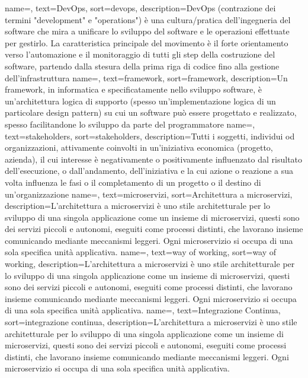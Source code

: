 {
	name=,
	text=DevOps,
	sort=devops,
	description={DevOps (contrazione dei termini "development" e "operations") è una cultura/pratica dell'ingegneria del software che mira a unificare lo sviluppo del software e le operazioni effettuate per gestirlo. La caratteristica principale del movimento è il forte orientamento verso l'automazione e il monitoraggio di tutti gli step della costruzione del software, partendo dalla stesura della prima riga di codice fino alla gestione dell'infrastruttura}
}
{
	name=,
	text=framework,
	sort=framework,
	description={Un framework, in informatica e specificatamente nello sviluppo software, è un'architettura logica di supporto (spesso un'implementazione logica di un particolare design pattern) su cui un software può essere progettato e realizzato, spesso facilitandone lo sviluppo da parte del programmatore}
}
{
	name=,
	text=stakeholders,
	sort=stakeholders,
	description={Tutti i soggetti, individui od organizzazioni, attivamente coinvolti in un’iniziativa economica (progetto, azienda), il cui interesse è negativamente o positivamente influenzato dal risultato dell’esecuzione, o dall’andamento, dell’iniziativa e la cui azione o reazione a sua volta influenza le fasi o il completamento di un progetto o il destino di un’organizzazione}
}
{
	name=,
	text=microservizi,
	sort=Architettura a microservizi,
	description={L'architettura a microservizi è uno stile architetturale per lo sviluppo di una singola applicazione come un insieme di microservizi, questi sono dei servizi piccoli e autonomi, eseguiti come	processi distinti, che lavorano insieme comunicando mediante meccanismi leggeri. Ogni microservizio si occupa di una sola specifica unità applicativa.}
}
{
	name=,
	text=way of working,
	sort=way of working,
	description={L'architettura a microservizi è uno stile architetturale per lo sviluppo di una singola applicazione come un insieme di microservizi, questi sono dei servizi piccoli e autonomi, eseguiti come	processi distinti, che lavorano insieme comunicando mediante meccanismi leggeri. Ogni microservizio si occupa di una sola specifica unità applicativa.}
}
{
	name=,
	text=Integrazione Continua,
	sort=integrazione continua,
	description={L'architettura a microservizi è uno stile architetturale per lo sviluppo di una singola applicazione come un insieme di microservizi, questi sono dei servizi piccoli e autonomi, eseguiti come	processi distinti, che lavorano insieme comunicando mediante meccanismi leggeri. Ogni microservizio si occupa di una sola specifica unità applicativa.}
}
